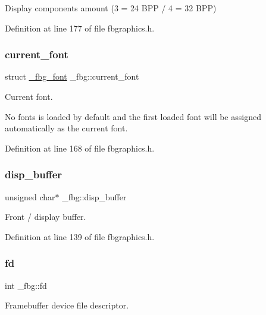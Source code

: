 Display components amount (3 = 24 B\+PP / 4 = 32 B\+PP) 



Definition at line 177 of file fbgraphics.\+h.

\mbox{\label{struct__fbg_a72868d703236aaabb7a5031703a6bbd8}} 
\subsubsection{\texorpdfstring{current\+\_\+font}{current\_font}}
{\footnotesize\ttfamily struct \mbox{\hyperlink{fbgraphics_8h_struct__fbg__font}{\+\_\+fbg\+\_\+font}} \+\_\+fbg\+::current\+\_\+font}



Current font. 

No fonts is loaded by default and the first loaded font will be assigned automatically as the current font. 

Definition at line 168 of file fbgraphics.\+h.

\mbox{\label{struct__fbg_aa20614c94c7235bc5bc105b6e71e1be8}} 
\subsubsection{\texorpdfstring{disp\+\_\+buffer}{disp\_buffer}}
{\footnotesize\ttfamily unsigned char$\ast$ \+\_\+fbg\+::disp\+\_\+buffer}



Front / display buffer. 



Definition at line 139 of file fbgraphics.\+h.

\mbox{\label{struct__fbg_acfa58132f44f89e832ae7f73f5583b7e}} 
\subsubsection{\texorpdfstring{fd}{fd}}
{\footnotesize\ttfamily int \+\_\+fbg\+::fd}



Framebuffer device file descriptor. 



